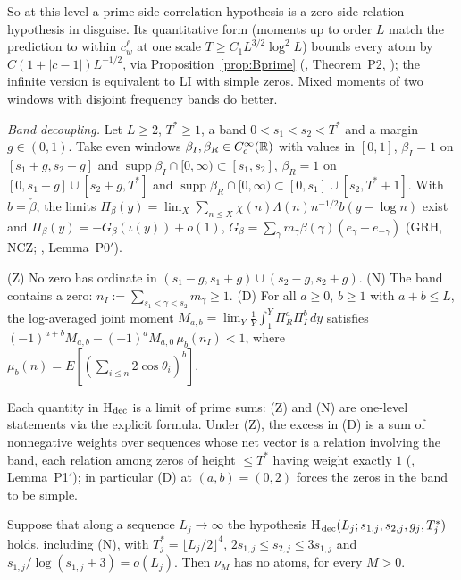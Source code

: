 So at this level a prime-side correlation hypothesis is a zero-side relation hypothesis in disguise. Its quantitative form (moments up to order $L$ match the prediction to within $c_w^\ell$ at one scale $T\ge C_1L^{3/2}\log^2L$) bounds every atom by $C(1+|c-1|)L^{-1/2}$, via Proposition~\ref{prop:Bprime} (, Theorem~P2, ); the infinite version is equivalent to LI with simple zeros. Mixed moments of two windows with disjoint frequency bands do better.

\emph{Band decoupling.} Let $L\ge2$, $T^*\ge1$, a band $0<s_1<s_2<T^*$ and a margin $g\in(0,1)$. Take even windows $\beta_I,\beta_R\in C_c^\infty(\mathbb R)$ with values in $[0,1]$, $\beta_I=1$ on $[s_1+g,s_2-g]$ and $\operatorname{supp}\beta_I\cap[0,\infty)\subset[s_1,s_2]$, $\beta_R=1$ on $[0,s_1-g]\cup[s_2+g,T^*]$ and $\operatorname{supp}\beta_R\cap[0,\infty)\subset[0,s_1]\cup[s_2,T^*+1]$. With $b=\check\beta$, the limits $\Pi_\beta(y)=\lim_X\sum_{n\le X}\chi(n)\Lambda(n)n^{-1/2}b(y-\log n)$ exist and $\Pi_\beta(y)=-G_\beta(\iota(y))+o(1)$, $G_\beta=\sum_\gamma m_\gamma\beta(\gamma)(e_\gamma+e_{-\gamma})$ (GRH, NCZ; , Lemma~P0$'$).

\begin{hypothesis}
\textup{(Z)} No zero has ordinate in $(s_1-g,s_1+g)\cup(s_2-g,s_2+g)$. \textup{(N)} The band contains a zero: $n_I:=\sum_{s_1<\gamma<s_2}m_\gamma\ge1$. \textup{(D)} For all $a\ge0$, $b\ge1$ with $a+b\le L$, the log-averaged joint moment $M_{a,b}=\lim_Y\frac1Y\int_1^Y\Pi_R^a\Pi_I^b\,dy$ satisfies $(-1)^{a+b}M_{a,b}-(-1)^aM_{a,0}\,\mu_b(n_I)<1$, where $\mu_b(n)=E[(\sum_{i\le n}2\cos\theta_i)^b]$.
\end{hypothesis}

Each quantity in H$_{\rm dec}$ is a limit of prime sums: (Z) and (N) are one-level statements via the explicit formula. Under (Z), the excess in (D) is a sum of nonnegative weights over sequences whose net vector is a relation involving the band, each relation among zeros of height $\le T^*$ having weight exactly $1$ (, Lemma~P1$'$); in particular (D) at $(a,b)=(0,2)$ forces the zeros in the band to be simple.

\begin{theorem}\label{thm:P7}
Suppose that along a sequence $L_j\to\infty$ the hypothesis H$_{\rm dec}(L_j;s_{1,j},s_{2,j},g_j,T^*_j)$ holds, including \textup{(N)}, with $T^*_j=\lfloor L_j/2\rfloor^4$, $2s_{1,j}\le s_{2,j}\le3s_{1,j}$ and $s_{1,j}/\log(s_{1,j}+3)=o(L_j)$. Then $\nu_M$ has no atoms, for every $M>0$.
\end{theorem}

